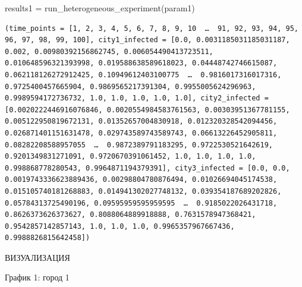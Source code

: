 \documentclass[
  12pt,
  a4paper,
  DIV=11,
  numbers=noendperiod]{scrreprt}
\newenvironment{Shaded}{\begin{snugshade}}{\end{snugshade}}
\newcommand{\FunctionTok}[1]{\textcolor[rgb]{0.28,0.35,0.67}{#1}}
\newcommand{\NormalTok}[1]{\textcolor[rgb]{0.00,0.23,0.31}{#1}}
\newcommand{\OperatorTok}[1]{\textcolor[rgb]{0.37,0.37,0.37}{#1}}
\begin{document}
\begin{Shaded}
\begin{Highlighting}[]
\NormalTok{results1 }\OperatorTok{=} \FunctionTok{run\_heterogeneous\_experiment}\NormalTok{(param1)}
\end{Highlighting}
\end{Shaded}

\begin{verbatim}
(time_points = [1, 2, 3, 4, 5, 6, 7, 8, 9, 10  …  91, 92, 93, 94, 95, 96, 97, 98, 99, 100], city1_infected = [0.0, 0.0031185031185031187, 0.002, 0.00980392156862745, 0.006054490413723511, 0.010648596321393998, 0.019588638589618023, 0.04448742746615087, 0.062118126272912425, 0.10949612403100775  …  0.9816017316017316, 0.9725400457665904, 0.9869565217391304, 0.9955005624296963, 0.9989594172736732, 1.0, 1.0, 1.0, 1.0, 1.0], city2_infected = [0.0020222446916076846, 0.0020554984583761563, 0.00303951367781155, 0.005122950819672131, 0.01352657004830918, 0.012320328542094456, 0.026871401151631478, 0.029743589743589743, 0.06613226452905811, 0.08282208588957055  …  0.9872389791183295, 0.9722530521642619, 0.9201349831271091, 0.9720670391061452, 1.0, 1.0, 1.0, 1.0, 0.998868778280543, 0.9964871194379391], city3_infected = [0.0, 0.0, 0.0019743336623889436, 0.00298804780876494, 0.01026694045174538, 0.015105740181268883, 0.014941302027748132, 0.039354187689202826, 0.05784313725490196, 0.09595959595959595  …  0.9185022026431718, 0.8626373626373627, 0.8088064889918888, 0.7631578947368421, 0.9542857142857143, 1.0, 1.0, 1.0, 0.9965357967667436, 0.9988826815642458])
\end{verbatim}

ВИЗУАЛИЗАЦИЯ

График 1: город 1
\end{document}
